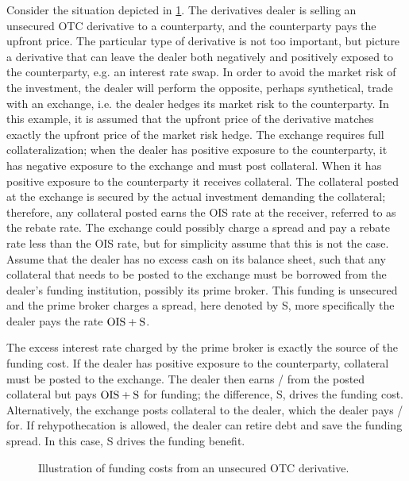 \documentclass[main.tex]{subfiles}
\begin{document}
        Consider the situation depicted in \cref{fig:funding-costs-unsecured-derivative}.
        The derivatives dealer is selling an unsecured OTC derivative to a counterparty,
        and the counterparty pays the upfront price.
        The particular type of derivative is not too important, 
        but picture a derivative that can leave the dealer both negatively and positively exposed to the counterparty, 
        e.g. an interest rate swap.
        In order to avoid the market risk of the investment, 
        the dealer will perform the opposite, perhaps synthetical, trade with an exchange,
        i.e. the dealer hedges its market risk to the counterparty.
        In this example, it is assumed that the upfront price of the derivative 
        matches exactly the upfront price of the market risk hedge.
        The exchange requires full collateralization;
        when the dealer has positive exposure to the counterparty, 
        it has negative exposure to the exchange and must post collateral. 
        When it has positive exposure to the counterparty it receives collateral.
        The collateral posted at the exchange is secured by the actual investment demanding the collateral;
        therefore, any collateral posted earns the OIS rate at the receiver, referred to as the rebate rate.
        The exchange could possibly charge a spread and pay a rebate rate less than the OIS rate,
        but for simplicity assume that this is not the case.
        Assume that the dealer has no excess cash on its balance sheet, 
        such that any collateral that needs to be posted to the exchange 
        must be borrowed from the dealer's funding institution,
        possibly its prime broker. 
        This funding is unsecured and the prime broker charges a spread, here denoted by S,
        more specifically the dealer pays the rate $\OIS/ + \text{S}$.

        The excess interest rate charged by the prime broker is exactly the source of the funding cost.
        If the dealer has positive exposure to the counterparty, collateral must be posted to the exchange.
        The dealer then earns \OIS/ from the posted collateral but pays $\OIS/ + \text{S}$ for funding;
        the difference, S, drives the funding cost.
        Alternatively, the exchange posts collateral to the dealer, which the dealer pays \OIS/ for.
        If rehypothecation is allowed, the dealer can retire debt and save the funding spread.
        In this case, S drives the funding benefit.

        \begin{figure}
            \centering
            \resizebox{\textwidth}{!}{%
            \begin{tikzpicture}
                
            \end{tikzpicture}        
            }   
            \caption{Illustration of funding costs from an unsecured OTC derivative.}
            \label{fig:funding-costs-unsecured-derivative}
        \end{figure}
\end{document}
